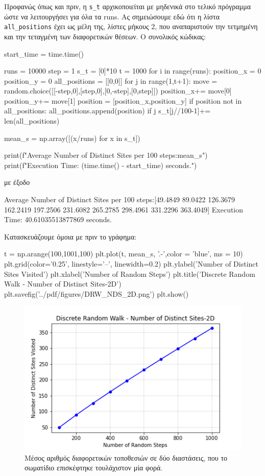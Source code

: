 \gr Προφανώς όπως και πριν, η {\en \texttt{s\_t}} αρχικοποιείται με μηδενικά στο τελικό πρόγραμμα ώστε να λειτουργήσει για όλα τα {\en runs}. Ας σημειώσουμε εδώ ότι η λίστα {\en \texttt{all\_positions}} έχει ως μέλη της, λίστες μήκους 2, που αναπαριστούν την τετμημένη και την τεταγμένη των διαφορετικών θέσεων. 
\newpage
\noindent
Ο συνολικός κώδικας:
\en 
\begin{python}
start_time = time.time()

runs = 10000
step = 1
s_t = [0]*10
t = 1000
for i in range(runs):
    position_x = 0
    position_y = 0 
    all_positions = [[0,0]]
    for j in range(1,t+1):
        move = random.choice([[-step,0],[step,0],[0,-step],[0,step]])
        position_x+= move[0]
        position_y+= move[1]
        position = [position_x,position_y]
        if position not in all_positions:
            all_positions.append(position)
        if j%
            s_t[j//100-1]+= len(all_positions)

mean_s = np.array([(x/runs) for x in s_t])

print(f"Average Number of Distinct Sites per 100 steps:{mean_s}")
print(f"Execution Time: {(time.time() - start_time)} seconds.")
\end{python}
\gr 
με έξοδο
\en
\begin{python}
Average Number of Distinct Sites per 100 steps:[49.4849
                                                89.0422 
                                                126.3679 
                                                162.2419 
                                                197.2506 
                                                231.6082 
                                                265.2785 
                                                298.4961
                                                331.2296 
                                                363.4049]
Execution Time: 40.61035513877869 seconds.
\end{python}
\gr 
\newpage
\noindent
Κατασκευάζουμε όμοια με πριν το γράφημα:
\en
\begin{python}
t = np.arange(100,1001,100)
plt.plot(t, mean_s, '.-',color = 'blue', ms = 10)
plt.grid(color='0.25', linestyle='--', linewidth=0.2)
plt.ylabel('Number of Distinct Sites Visited')
plt.xlabel('Number of Random Steps')
plt.title('Discrete Random Walk - Number of Distinct Sites-2D')
plt.savefig('../pdf/figures/DRW_NDS_2D.png')
plt.show()
\end{python}
\gr 
\begin{figure}[H]
\begin{center}
\includegraphics[scale=1]{figures/DRW_NDS_2D.png}
\caption{Μέσος αριθμός διαφορετικών τοποθεσιών σε δύο διαστάσεις, που το σωματίδιο επισκέφτηκε τουλάχιστον μία φορά.}
\label{figuridion3d}
\end{center}
\end{figure}